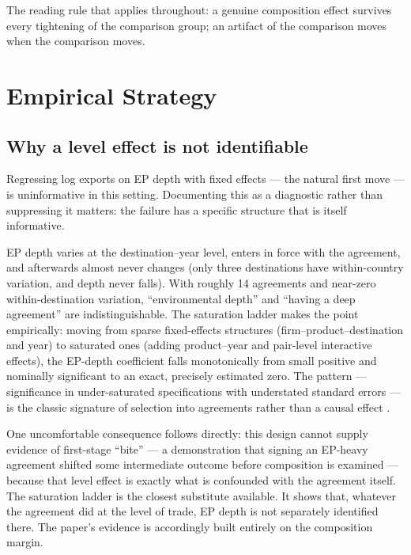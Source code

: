 \documentclass[12pt]{article}
\begin{document}
The reading rule that applies throughout: a genuine composition effect survives every
tightening of the comparison group; an artifact of the comparison moves when the
comparison moves.

\section{Empirical Strategy}\label{sec:strategy}

\subsection{Why a level effect is not identifiable}

Regressing log exports on EP depth with fixed effects --- the natural first move ---
is uninformative in this setting. Documenting this as a diagnostic rather than suppressing
it matters: the failure has a specific structure that is itself informative.

EP depth varies at the destination--year level, enters in force with the agreement, and
afterwards almost never changes (only three destinations have within-country variation,
and depth never falls). With roughly 14 agreements and near-zero within-destination
variation, ``environmental depth'' and ``having a deep agreement'' are indistinguishable.
The saturation ladder makes the point empirically: moving from sparse fixed-effects
structures (firm--product--destination and year) to saturated ones (adding
product--year and pair-level interactive effects), the EP-depth coefficient falls
monotonically from small positive and nominally significant to an exact, precisely
estimated zero. The pattern --- significance in under-saturated specifications with
understated standard errors --- is the classic signature of selection into agreements
rather than a causal effect \citep{bertrand2004, goodmanbacon2021}.

One uncomfortable consequence follows directly: this design cannot supply evidence of
first-stage ``bite'' --- a demonstration that signing an EP-heavy agreement shifted some
intermediate outcome before composition is examined --- because that level effect is
exactly what is confounded with the agreement itself. The saturation ladder is the closest
substitute available. It shows that, whatever the agreement did at the level of trade, EP
depth is not separately identified there. The paper's evidence is accordingly built
entirely on the composition margin.
\end{document}
